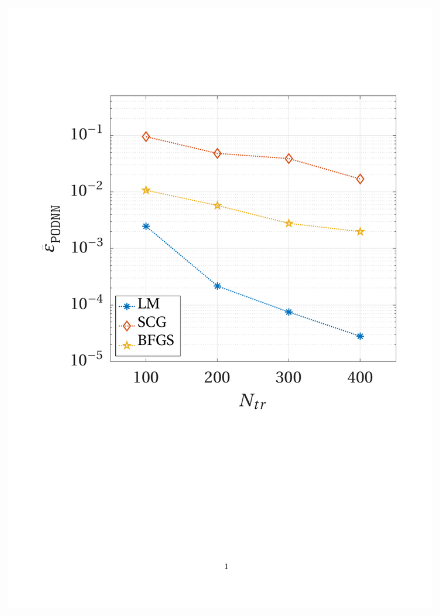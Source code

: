\documentclass[longtitle]{elsarticle}
\numberwithin{equation}{section}
\theoremstyle{theorem}
\theoremstyle{definition}
\theoremstyle{remark}
\theoremstyle{proposition}
\numberwithin{figure}{section}
\begin{document}
\begin{figure}[t!]
			\includegraphics[scale = 0.3, trim = {1cm 9.8cm 1.5cm 3.5cm}, clip]{poisson1d_training_comparison_error}
			\hspace*{0.3cm}

\end{figure}
\end{document}
